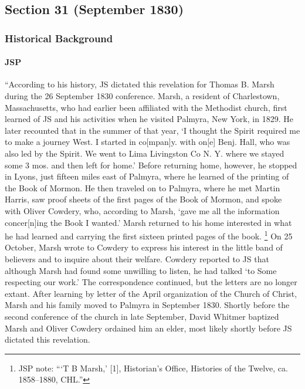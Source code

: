 \subsection{Section 31 (September 1830)}
	\label{DC31}
	
	\subsubsection{Historical Background}
		\label{DC31-HB}
		
		\paragraph{JSP}
		
			``According to his history, JS dictated this revelation for Thomas B. Marsh during the 26 September 1830 conference. Marsh, a resident of Charlestown, Massachusetts, who had earlier been affiliated with the Methodist church, first learned of JS and his activities when he visited Palmyra, New York, in 1829. He later recounted that in the summer of that year, `I thought the Spirit required me to make a journey West. I started in co[mpan]y. with on[e] Benj. Hall, who was also led by the Spirit. We went to Lima Livingston Co N. Y. where we stayed some 3 mos. and then left for home.' Before returning home, however, he stopped in Lyons, just fifteen miles east of Palmyra, where he learned of the printing of the Book of Mormon. He then traveled on to Palmyra, where he met Martin Harris, saw proof sheets of the first pages of the Book of Mormon, and spoke with Oliver Cowdery, who, according to Marsh, `gave me all the information concer[n]ing the Book I wanted.' Marsh returned to his home interested in what he had learned and carrying the first sixteen printed pages of the book.%
				\footnote{%
					JSP note: ```T B Marsh,' [1], Historian's Office, Histories of the Twelve, ca. 1858--1880, CHL.''
					}
			On 25 October, Marsh wrote to Cowdery to express his interest in the little band of believers and to inquire about their welfare. Cowdery reported to JS that although Marsh had found some unwilling to listen, he had talked `to Some respecting our work.' The correspondence continued, but the letters are no longer extant. After learning by letter of the April organization of the Church of Christ, Marsh and his family moved to Palmyra in September 1830. Shortly before the second conference of the church in late September, David Whitmer baptized Marsh and Oliver Cowdery ordained him an elder, most likely shortly before JS dictated this revelation.
			
